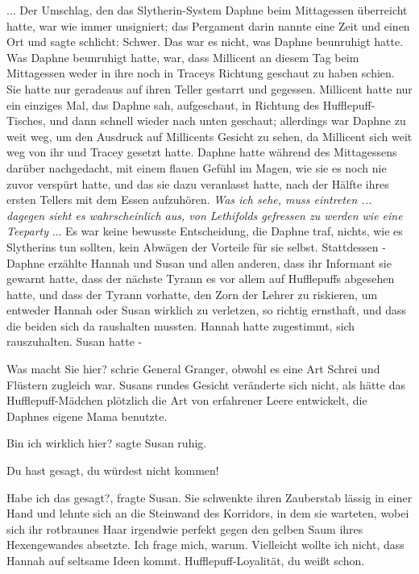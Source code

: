 ... Der Umschlag, den das Slytherin-System Daphne beim Mittagessen überreicht
hatte, war wie immer unsigniert; das Pergament darin nannte eine Zeit und einen
Ort und sagte schlicht: \glqq{}Schwer.\grqq{} Das war es nicht, was Daphne
beunruhigt hatte. Was Daphne beunruhigt hatte, war, dass Millicent an diesem Tag
beim Mittagessen weder in ihre noch in Traceys Richtung geschaut zu haben
schien. Sie hatte nur geradeaus auf ihren Teller gestarrt und gegessen.
Millicent hatte nur ein einziges Mal, das Daphne sah, aufgeschaut, in Richtung
des Hufflepuff-Tisches, und dann schnell wieder nach unten geschaut; allerdings
war Daphne zu weit weg, um den Ausdruck auf Millicents Gesicht zu sehen, da
Millicent sich weit weg von ihr und Tracey gesetzt hatte. Daphne hatte während
des Mittagessens darüber nachgedacht, mit einem flauen Gefühl im Magen, wie sie
es noch nie zuvor verspürt hatte, und das sie dazu veranlasst hatte, nach der
Hälfte ihres ersten Tellers mit dem Essen aufzuhören. \emph{Was ich sehe, muss
eintreten ... dagegen sieht es wahrscheinlich aus, von Lethifolds gefressen zu
werden wie eine Teeparty} ... Es war keine bewusste Entscheidung, die Daphne
traf, nichts, wie es Slytherins tun sollten, kein Abwägen der Vorteile für sie
selbst. Stattdessen - Daphne erzählte Hannah und Susan und allen anderen, dass
ihr Informant sie gewarnt hatte, dass der nächste Tyrann es vor allem auf
Hufflepuffs abgesehen hatte, und dass der Tyrann vorhatte, den Zorn der Lehrer
zu riskieren, um entweder Hannah oder Susan wirklich zu verletzen, so richtig
ernsthaft, und dass die beiden sich da raushalten mussten. Hannah hatte
zugestimmt, sich rauszuhalten. Susan hatte -

\glqq{}Was macht Sie hier?\grqq{} schrie General Granger, obwohl es eine Art
Schrei und Flüstern zugleich war. Susans rundes Gesicht veränderte sich nicht,
als hätte das Hufflepuff-Mädchen plötzlich die Art von erfahrener Leere
entwickelt, die Daphnes eigene Mama benutzte.

\glqq{}Bin ich wirklich hier?\grqq{} sagte Susan ruhig.

\glqq{}Du hast gesagt, du würdest nicht kommen!\grqq{}

\glqq{}Habe ich das gesagt?\grqq{}, fragte Susan. Sie schwenkte ihren Zauberstab
lässig in einer Hand und lehnte sich an die Steinwand des Korridors, in dem sie
warteten, wobei sich ihr rotbraunes Haar irgendwie perfekt gegen den gelben Saum
ihres Hexengewandes absetzte. \glqq{}Ich frage mich, warum. Vielleicht wollte ich
nicht, dass Hannah auf seltsame Ideen kommt. Hufflepuff-Loyalität, du weißt
schon.\grqq{}

